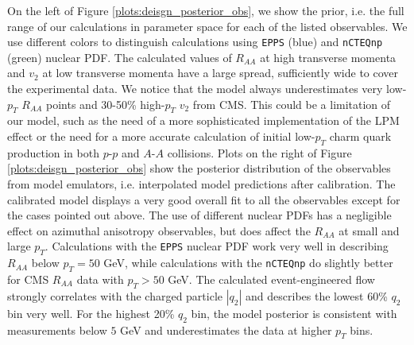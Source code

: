 \documentclass[aps, prc, reprint, amsmath, groupedaddress, nofootinbib]{revtex4-1}
\begin{document}
On the left of Figure \ref{plots:deisgn_posterior_obs}, we show the prior, i.e. the full range of our calculations in parameter space for each of the listed observables. 
We use different colors to distinguish calculations using {\tt EPPS} (blue) and
{\tt nCTEQnp} (green) nuclear PDF.
The calculated values of $R_{AA}$ at high transverse momenta and $v_2$ at low transverse momenta have a large spread, sufficiently wide to cover the experimental data.
We notice that the model always underestimates very low-$p_T$ $R_{AA}$ points and 30-50\% high-$p_T$ $v_2$ from CMS.
This could be a limitation of our model, such as the need of a more sophisticated implementation of the LPM effect or the need for a more accurate calculation of initial low-$p_T$ charm quark production in both $p$-$p$ and $A$-$A$ collisions. 
Plots on the right of Figure \ref{plots:deisgn_posterior_obs} show the posterior distribution of the observables from model emulators, i.e. interpolated model predictions after calibration.
The calibrated model displays a very good overall fit to all the observables except for the cases pointed out above.
The use of different nuclear PDFs has a  negligible effect on azimuthal anisotropy observables, but does affect the $R_{AA}$ at small and large $p_T$.
Calculations with the {\tt EPPS} nuclear PDF work very well in describing $R_{AA}$ below $p_T = 50$ GeV, while calculations with the {\tt nCTEQnp} do slightly better for CMS $R_{AA}$ data with $p_T>50$ GeV.
The calculated event-engineered flow strongly correlates with the charged particle $|q_2|$ and describes the lowest 60\% $q_2$ bin very well.
For the highest 20\% $q_2$ bin, the model posterior is consistent with measurements below $5$ GeV and underestimates the data at higher $p_T$ bins.
\end{document}
